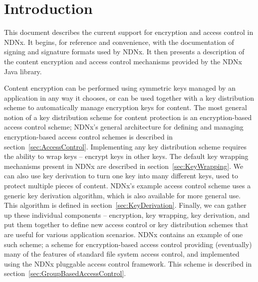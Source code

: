 


\renewcommand{\paragraph}[1]{\medskip\noindent{\bf{#1}}}
\newcommand{\ndnxpath}[1] {\medskip\noindent{\tt{#1}}}

\def \Obj {{\textbf{O}}}        %
\def \Ko {{\textbf{K}_O}}       %
\def \Kc {{\textbf{K}_c}}       %
\def \KDF {{\textbf{KDF}}}      %
\def \IV {{\textbf{IV}}}        %
\def \PRF {{\textbf{PRF}}}      %
\def \G {{\textbf{G}}}          %
\def \N {{\textbf{N}}}          %
\def \DK {{\textbf{DK}}}        %
\def \NK {{\textbf{NK}}}        %
\def \GPK {{\textbf{GPK}}}      %
\def \GSK {{\textbf{GSK}}}      %
\def \UPK {{\textbf{UPK}}}      %
\def \USK {{\textbf{USK}}}      %
\def \PK {{\textbf{PK}}}      %

\section{Introduction}
\label{sec:introduction}

This document describes the current support for encryption and access
control in NDNx.  It begins, for reference and convenience, with the
documentation of signing and signature formats used by NDNx.
It then presents a description of the content encryption and access control
mechanisms provided by the NDNx Java library.

Content encryption can be performed using symmetric keys managed by an
application in any way it chooses, or can be used together with a key
distribution scheme to automatically manage encryption keys for
content. The most general notion of a key distribution scheme for
content protection is an encryption-based access control scheme;
NDNx's general architecture for defining and managing encryption-based
access control schemes is described in
section~\ref{sec:AccessControl}. Implementing any key distribution
scheme requires the ability to wrap keys -- encrypt keys in other
keys. The default key wrapping mechanisms present in NDNx are
described in section~\ref{sec:KeyWrapping}. We can also use key
derivation to turn one key into many different keys, used to protect
multiple pieces of content.  NDNx's example access control scheme uses
a generic key derivation algorithm, which is also available for more
general use. This algorithm is defined in
section~\ref{sec:KeyDerivation}. Finally, we can gather up these
individual components -- encryption, key wrapping, key derivation, and
put them together to define new access control or key distribution
schemes that are useful for various application scenarios. NDNx
contains an example of one such scheme; a scheme for encryption-based
access control providing (eventually) many of the features of standard
file system access control, and implemented using the NDNx pluggable
access control framework. This scheme is described in
section~\ref{sec:GroupBasedAccessControl}.

